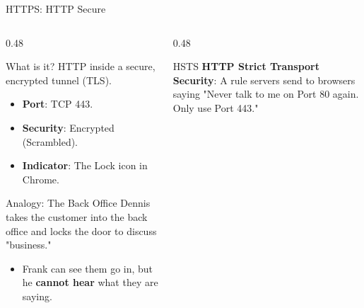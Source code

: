 \documentclass[aspectratio=169]{beamer}  %
\begin{document}
\begin{frame}{HTTPS: HTTP Secure}
    \begin{columns}[T]
        \begin{column}{0.48\textwidth}
            \begin{block}{What is it?}
                \small
                HTTP inside a secure, encrypted tunnel (TLS).
                \begin{itemize}
                    \item \textbf{Port}: TCP 443.
                    \item \textbf{Security}: Encrypted (Scrambled).
                    \item \textbf{Indicator}: The \iconlock[0.3cm] Lock icon in Chrome.
                \end{itemize}
            \end{block}
            \begin{exampleblock}{Analogy: The Back Office}
                \small
                Dennis takes the customer into the back office and locks the door to discuss "business."
                \begin{itemize}
                    \item Frank can see them go in, but he \textbf{cannot hear} what they are saying.
                \end{itemize}
            \end{exampleblock}
        \end{column}
        \begin{column}{0.48\textwidth}
            \begin{center}
            \end{center}
            \begin{alertblock}{HSTS}
                \small
                \textbf{HTTP Strict Transport Security}: A rule servers send to browsers saying "Never talk to me on Port 80 again. Only use Port 443."
            \end{alertblock}
        \end{column}
    \end{columns}
\end{frame}
\end{document}
